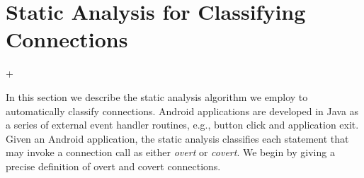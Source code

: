 \section{Static Analysis for Classifying Connections}
\label{sec:analysis}

\lstMakeShortInline[basicstyle=\scriptsize\ttfamily,keywordstyle=\color{DarkPurple},breaklines=false]+

In this section we describe the static analysis algorithm we employ to
automatically classify connections.  Android applications are
developed in Java as a series of external event handler routines,
e.g., button click and application exit.  Given an Android
application, the static analysis classifies each statement that may
invoke a connection call as either {\it overt} or {\it covert}.  We
begin by giving a precise definition of overt and covert connections. 




